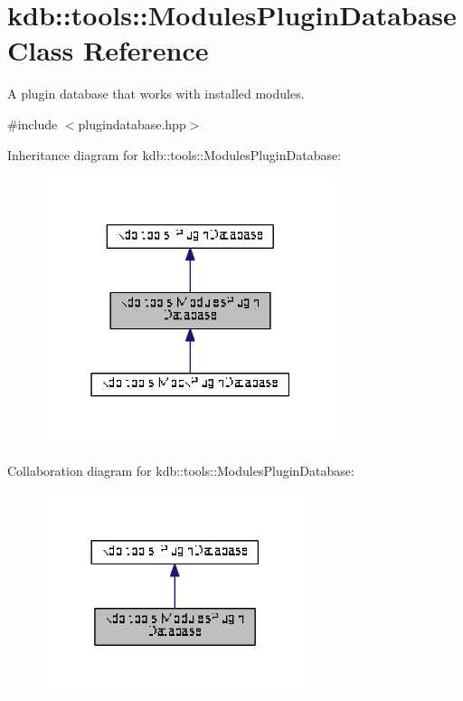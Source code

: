\hypertarget{classkdb_1_1tools_1_1ModulesPluginDatabase}{}\section{kdb\+:\+:tools\+:\+:Modules\+Plugin\+Database Class Reference}
\label{classkdb_1_1tools_1_1ModulesPluginDatabase}


A plugin database that works with installed modules.  




{\ttfamily \#include $<$plugindatabase.\+hpp$>$}



Inheritance diagram for kdb\+:\+:tools\+:\+:Modules\+Plugin\+Database\+:
\nopagebreak
\begin{figure}[H]
\begin{center}
\leavevmode
\includegraphics[width=244pt]{classkdb_1_1tools_1_1ModulesPluginDatabase__inherit__graph}
\end{center}
\end{figure}


Collaboration diagram for kdb\+:\+:tools\+:\+:Modules\+Plugin\+Database\+:
\nopagebreak
\begin{figure}[H]
\begin{center}
\leavevmode
\includegraphics[width=218pt]{classkdb_1_1tools_1_1ModulesPluginDatabase__coll__graph}
\end{center}
\end{figure}
